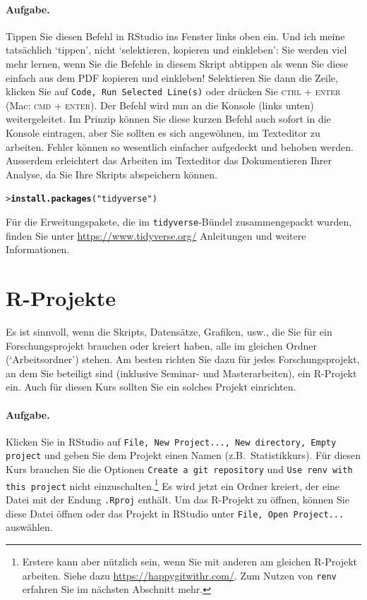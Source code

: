 \documentclass[oneside, 10pt]{book}\usepackage[]{graphicx}\usepackage[]{xcolor}
\makeatletter
\newcommand{\hlstr}[1]{\textcolor[rgb]{0.192,0.494,0.8}{#1}}%
\newcommand{\hlstd}[1]{\textcolor[rgb]{0.345,0.345,0.345}{#1}}%
\newcommand{\hlkwd}[1]{\textcolor[rgb]{0.737,0.353,0.396}{\textbf{#1}}}%
\newenvironment{kframe}{%
 \def\at@end@of@kframe{}%
 \ifinner\ifhmode%
  \def\at@end@of@kframe{\end{minipage}}%
  \begin{minipage}{\columnwidth}%
 \fi\fi%
 \def\FrameCommand##1{\hskip\@totalleftmargin \hskip-\fboxsep
 \colorbox{shadecolor}{##1}\hskip-\fboxsep
     \hskip-\linewidth \hskip-\@totalleftmargin \hskip\columnwidth}%
 \MakeFramed {\advance\hsize-\width
   \@totalleftmargin\z@ \linewidth\hsize
   \@setminipage}}%
 {\par\unskip\endMakeFramed%
 \at@end@of@kframe}
\newenvironment{knitrout}{}{} %
\makeatother
\begin{document}
\paragraph{Aufgabe.}
Tippen Sie diesen Befehl in RStudio ins
Fenster links oben ein.
Und ich meine tatsächlich `tippen', nicht `selektieren, kopieren und einkleben': 
Sie werden viel mehr lernen, wenn Sie die Befehle in diesem Skript
abtippen als wenn Sie diese einfach aus dem PDF kopieren und einkleben!
Selektieren Sie dann die Zeile, klicken
Sie auf \texttt{Code, Run Selected Line(s)}
oder drücken Sie \textsc{ctrl + enter}
(Mac: \textsc{cmd + enter}).
Der Befehl wird nun an die Konsole (links unten)
weitergeleitet.
Im Prinzip können Sie diese kurzen Befehl auch
sofort in die Konsole eintragen, aber Sie sollten es sich angewöhnen,
im Texteditor zu arbeiten. Fehler können so wesentlich einfacher
aufgedeckt und behoben werden.
Ausserdem erleichtert das Arbeiten im Texteditor
das Dokumentieren Ihrer Analyse, da Sie Ihre Skripts abspeichern können.
\begin{knitrout}
\color{fgcolor}\begin{kframe}
\begin{alltt}
\hlstd{> }\hlkwd{install.packages}\hlstd{(}\hlstr{"tidyverse"}\hlstd{)}
\end{alltt}
\end{kframe}
\end{knitrout}

Für die Erweitungspakete, die im \texttt{tidyverse}-Bündel
zusammengepackt wurden, finden Sie unter \url{https://www.tidyverse.org/}
Anleitungen und weitere Informationen.

\section{R-Projekte}
Es ist sinnvoll, wenn die Skripts, Datensätze, Grafiken, usw.,
die Sie für ein Forschungsprojekt brauchen oder kreiert haben,
alle im gleichen Ordner (`Arbeitsordner') stehen.
Am besten richten Sie dazu für jedes Forschungsprojekt, an dem Sie beteiligt
sind (inklusive Seminar- und Masterarbeiten), ein R-Projekt ein.
Auch für diesen Kurs sollten Sie ein solches Projekt einrichten.

\paragraph{Aufgabe.}
Klicken Sie in RStudio auf \texttt{File, New Project..., New directory, Empty project} und geben Sie dem
Projekt einen Namen (z.B.\ Statistikkurs).
Für diesen Kurs brauchen Sie
die Optionen \texttt{Create a git repository}
und \texttt{Use renv with this project} nicht 
einzuschalten.\footnote{Erstere kann aber nützlich sein, wenn Sie 
mit anderen am gleichen R-Projekt arbeiten. Siehe dazu
\url{https://happygitwithr.com/}. Zum Nutzen
von \texttt{renv} erfahren Sie im nächsten Abschnitt mehr.}
Es wird jetzt ein Ordner kreiert, der eine Datei
mit der Endung \texttt{.Rproj} enthält.
Um das R-Projekt zu öffnen, können Sie diese Datei
öffnen oder das Projekt in RStudio unter
\texttt{File, Open Project...} auswählen.
\end{document}
